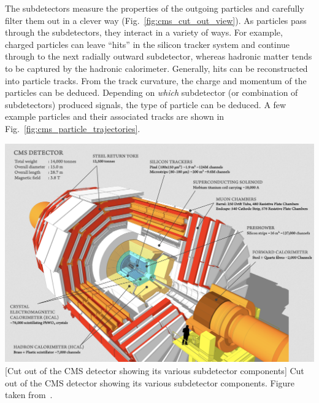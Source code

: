 The subdetectors measure the properties of the outgoing particles and carefully filter them out in a clever way (Fig.~\ref{fig:cms_cut_out_view}).
As particles pass through the subdetectors, they interact in a variety of ways.
For example, charged particles can leave ``hits'' in the silicon tracker system and continue through to the next radially outward subdetector, whereas hadronic matter tends to be captured by the hadronic calorimeter.
Generally, hits can be reconstructed into particle tracks.
From the track curvature, the charge and momentum of the particles can be deduced.
Depending on \emph{which} subdetector (or combination of subdetectors) produced signals, the type of particle can be deduced.
A few example particles and their associated tracks are shown in Fig.~\ref{fig:cms_particle_trajectories}.
\begin{multiFigure}
    \centering
    \includegraphics[width=\textwidth,keepaspectratio]{figures/cms/cms_cut_away.png}
        [Cut out of the CMS detector showing its various subdetector components]
        {Cut out of the CMS detector showing its various subdetector components.
        Figure taken from~\cite{PhysRevLett.114.191803}. %
        }
    \label{fig:cms_cut_out_view}
\end{multiFigure}

